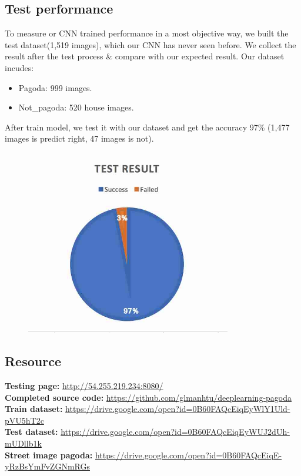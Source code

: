 \subsection{Test performance}
To measure or CNN trained performance in a most objective way, we built the test dataset(1,519 images), which our CNN has never seen before. We collect the result after the test process \& compare with our expected result. Our dataset incudes:
\begin{itemize}
\item Pagoda: 999 images.
\item Not\_pagoda: 520 house images.
\end{itemize}
After train model, we test it with our dataset and get the accuracy 97\% (1,477 images is predict right, 47 images is not).
\begin{figure}[H]
\centering
\includegraphics[width=0.8\textwidth]{images/testresult.jpg}
\label{fig:samplepagoda}
\end{figure}

\subsection{Resource}
\textbf{Testing page:} \url{http://54.255.219.234:8080/}\\
\textbf{Completed source code:} \url{https://github.com/glmanhtu/deeplearning-pagoda}\\
\textbf{Train dataset:} \url{https://drive.google.com/open?id=0B60FAQcEiqEyWlY1Uld-pVU5hT2c}\\
\textbf{Test dataset:} \url{https://drive.google.com/open?id=0B60FAQcEiqEyWUJ2dUh-mUDllb1k}\\
\textbf{Street image pagoda: } \url{https://drive.google.com/open?id=0B60FAQcEiqE-yRzBsYmFvZGNmRGs}



